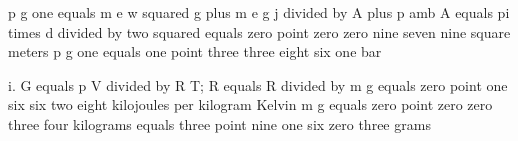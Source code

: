 p g one equals m e w squared g plus m e g j divided by A plus p amb  
A equals pi times d divided by two squared equals zero point zero zero nine seven nine square meters  
p g one equals one point three three eight six one bar  

i. G equals p V divided by R T; R equals R divided by m g equals zero point one six six two eight kilojoules per kilogram Kelvin  
m g equals zero point zero zero three four kilograms  
equals three point nine one six zero three grams